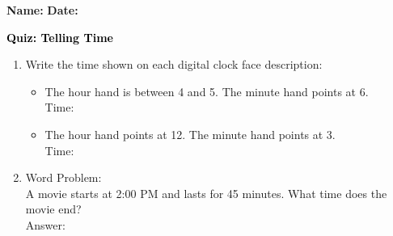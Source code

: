 \documentclass[12pt, letterpaper, fleqn]{article}
\newcommand{\blank}{\underline{\hspace{2.2cm}}}
\begin{document}
\textbf{Name:} \underline{\hspace{5cm}}
\hfill
\textbf{Date:} \underline{\hspace{3cm}}\\

\begin{tcolorbox}[colback=customteal!20]
    \large\textcolor{black}{\textbf{Quiz: Telling Time}}
\end{tcolorbox}

\vspace{5mm}
\begin{enumerate}[itemsep=3.5cm, leftmargin=0.6cm]
\item Write the time shown on each digital clock face description:
  \begin{itemize}[itemsep=1cm]
    \item The hour hand is between 4 and 5. The minute hand points at 6. \\ Time: \blank
    \item The hour hand points at 12. The minute hand points at 3. \\ Time: \blank
  \end{itemize}

\item Word Problem:
\\
A movie starts at 2:00 PM and lasts for 45 minutes. What time does the movie end?
\\
Answer: \blank
\end{enumerate}
\end{document}
